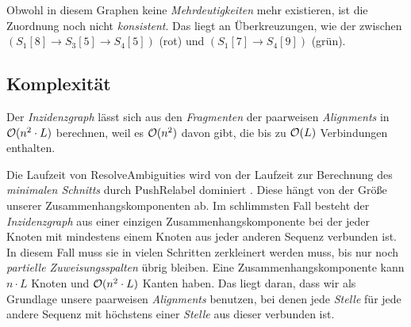 \begin{center}
\end{center}

Obwohl in diesem Graphen keine \emph{Mehrdeutigkeiten} mehr existieren, ist die Zuordnung noch nicht \emph{konsistent}. Das liegt an Überkreuzungen, wie der zwischen $(S_1[8] \rightarrow S_3[5] \rightarrow S_4[5])$ (rot) und $(S_1[7] \rightarrow S_4[9])$ (grün). 

\subsection{Komplexität}\label{ch:ra_kompl}

Der \emph{Inzidenzgraph} lässt sich aus den \emph{Fragmenten} der paarweisen \emph{Alignments} in $\mathcal{O}(n^2\cdot L)$ berechnen, weil es $\mathcal{O}(n^2)$ davon gibt, die bis zu $\mathcal{O}(L)$ Verbindungen enthalten.

Die Laufzeit von \textrm{ResolveAmbiguities} wird von der Laufzeit zur Berechnung des \emph{minimalen Schnitts} durch \textrm{PushRelabel} dominiert \citep{cpm10}. Diese hängt von der Größe unserer Zusammenhangskomponenten ab. Im schlimmsten Fall besteht der \emph{Inzidenzgraph} aus einer einzigen Zusammenhangskomponente bei der jeder Knoten mit mindestens einem Knoten aus jeder anderen Sequenz verbunden ist. In diesem Fall muss sie in vielen Schritten zerkleinert werden muss, bis nur noch \emph{partielle Zuweisungsspalten} übrig bleiben. Eine Zusammenhangskomponente kann $n\cdot L$ Knoten und $\mathcal{O}(n^2\cdot L)$ Kanten haben. Das liegt daran, dass wir als Grundlage unsere paarweisen \emph{Alignments} benutzen, bei denen jede \emph{Stelle} für jede andere Sequenz mit höchstens einer \emph{Stelle} aus dieser verbunden ist. 

